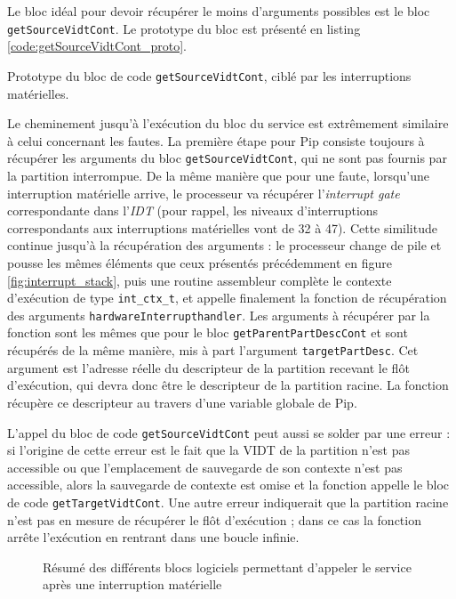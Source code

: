 		Le bloc idéal pour devoir récupérer le moins d'arguments possibles est le bloc \texttt{getSourceVidtCont}. Le prototype du bloc est présenté en listing \ref{code:getSourceVidtCont_proto}.

		\begin{listing}[!ht]
			\caption{Prototype du bloc de code \texttt{getSourceVidtCont}, ciblé par les interruptions matérielles.}
			\label{code:getSourceVidtCont_proto}
		\end{listing}

		Le cheminement jusqu'à l'exécution du bloc du service est extrêmement similaire à celui concernant les fautes. La première étape pour Pip consiste toujours à récupérer les arguments du bloc \texttt{getSourceVidtCont}, qui ne sont pas fournis par la partition interrompue. De la même manière que pour une faute, lorsqu'une interruption matérielle arrive, le processeur va récupérer l'\emph{interrupt gate} correspondante dans l'\emph{IDT} (pour rappel, les niveaux d'interruptions correspondants aux interruptions matérielles vont de 32 à 47). Cette similitude continue jusqu'à la récupération des arguments : le processeur change de pile et pousse les mêmes éléments que ceux présentés précédemment en figure \ref{fig:interrupt_stack}, puis une routine assembleur complète le contexte d'exécution de type \texttt{int\_ctx\_t}, et appelle finalement la fonction de récupération des arguments \texttt{hardwareInterrupthandler}. Les arguments à récupérer par la fonction sont les mêmes que pour le bloc \texttt{getParentPartDescCont} et sont récupérés de la même manière, mis à part l'argument \texttt{targetPartDesc}. Cet argument est l'adresse réelle du descripteur de la partition recevant le flôt d'exécution, qui devra donc être le descripteur de la partition racine. La fonction récupère ce descripteur au travers d'une variable globale de Pip.

		L'appel du bloc de code \texttt{getSourceVidtCont} peut aussi se solder par une erreur : si l'origine de cette erreur est le fait que la VIDT de la partition n'est pas accessible ou que l'emplacement de sauvegarde de son contexte n'est pas accessible, alors la sauvegarde de contexte est omise et la fonction appelle le bloc de code \texttt{getTargetVidtCont}. Une autre erreur indiquerait que la partition racine n'est pas en mesure de récupérer le flôt d'exécution ; dans ce cas la fonction arrête l'exécution en rentrant dans une boucle infinie.

		\begin{figure}[!b]
			\centering
			
			\caption{Résumé des différents blocs logiciels permettant d'appeler le service après une interruption matérielle}
			\label{fig:interrupt_software}
		\end{figure}

